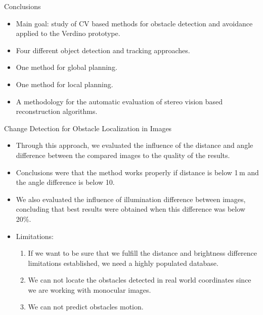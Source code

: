 \graphicspath{{./images/bmps/}{./images/vects/}{./images/}
	      {./images/presentation/bmps/}{./images/presentation/vects/}{./images/presentation/}
	      {./images/chapter00/bmps/}{./images/chapter00/vects/}{./images/chapter00/}}

\begin{frame}{Conclusions}
  \begin{itemize}
   \item Main goal: study of CV based methods for obstacle detection and avoidance applied to the Verdino prototype. 
   \item Four different object detection and tracking approaches.
   \item One method for global planning.
   \item One method for local planning.
   \item A methodology for the automatic evaluation of stereo vision based reconstruction algorithms.
  \end{itemize}
\end{frame}

\begin{frame}{Change Detection for Obstacle Localization in Images}
  \begin{itemize}
   \item Through this approach, we evaluated the influence of the distance and angle difference between the compared images to the quality of the results. 
   \item Conclusions were that the method works properly if distance is below 1\,m and the angle difference is below 10\textdegree. 
   \item We also evaluated the influence of illumination difference between images, concluding that best results were obtained when this difference was below 20\%.
   \item Limitations:
   \begin{enumerate}
    \item If we want to be sure that we fulfill the distance and brightness difference limitations established, we need a highly populated database. 
    \item We can not locate the obstacles detected in real world coordinates since we are working with monocular images.
    \item We can not predict obstacles motion.
   \end{enumerate}
  \end{itemize}
\end{frame}

